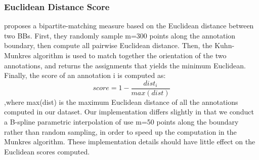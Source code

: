 \documentclass[12pt]{article}
\begin{document}
\subsubsection{Euclidean Distance Score}
\par \cite{Vittayakorn2011} proposes a bipartite-matching measure based on the Euclidean distance between two BBs. First, they randomly sample m=300 points along the annotation boundary, then compute all pairwise Euclidean distance. Then, the Kuhn-Munkres algorithm is used to match together the orientation of the two annotations, and returns the assignments that yields the minimum Euclidean. Finally, the score of an annotation i is computed as:
\begin{equation}
score = 1-\frac{dist_i}{max(dist)}
\end{equation},where max(dist) is the maximum Euclidean distance of all the annotations computed in our dataset. Our implementation differs slightly in that we conduct a B-spline parametric interpolation of use m=50 points along the boundary rather than random sampling, in order to speed up the computation in the Munkres algorithm. These implementation details should have little effect on the Euclidean scores computed.



\end{document}
